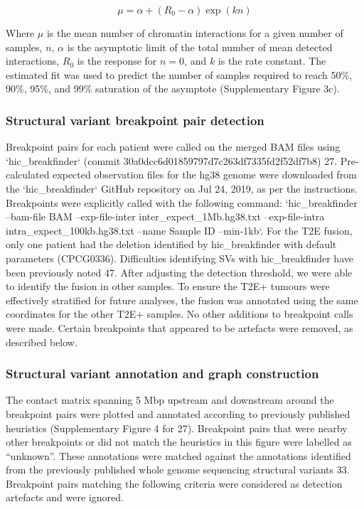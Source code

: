 \begin{equation}
 \mu = \alpha + \left( R_0 - \alpha \right) \exp \left(kn \right)
\end{equation}

Where $\mu$ is the mean number of chromatin interactions for a given number of samples, $n$, $\alpha$ is the asymptotic limit of the total number of mean detected interactions, $R_0$ is the response for $n = 0$, and $k$ is the rate constant.
The estimated fit was used to predict the number of samples required to reach 50\%, 90\%, 95\%, and 99\% saturation of the asymptote (Supplementary Figure 3c).

\subsubsection{Structural variant breakpoint pair detection}

Breakpoint pairs for each patient were called on the merged BAM files using `hic_breakfinder` (commit 30a0dcc6d01859797d7c263df7335fd2f52df7b8) 27.
Pre-calculated expected observation files for the hg38 genome were downloaded from the `hic_breakfinder` GitHub repository on Jul 24, 2019, as per the instructions.
Breakpoints were explicitly called with the following command: `hic_breakfinder --bam-file {BAM} --exp-file-inter inter_expect_1Mb.hg38.txt --exp-file-intra intra_expect_100kb.hg38.txt --name {Sample ID} --min-1kb`.
For the T2E fusion, only one patient had the deletion identified by hic_breakfinder with default parameters (CPCG0336).
Difficulties identifying SVs with hic_breakfinder have been previously noted 47.
After adjusting the detection threshold, we were able to identify the fusion in other samples.
To ensure the T2E+ tumours were effectively stratified for future analyses, the fusion was annotated using the same coordinates for the other T2E+ samples.
No other additions to breakpoint calls were made.
Certain breakpoints that appeared to be artefacts were removed, as described below.

\subsubsection{Structural variant annotation and graph construction}
The contact matrix spanning 5 Mbp upstream and downstream around the breakpoint pairs were plotted and annotated according to previously published heuristics (Supplementary Figure 4 for 27).
Breakpoint pairs that were nearby other breakpoints or did not match the heuristics in this figure were labelled as “unknown”.
These annotations were matched against the annotations identified from the previously published whole genome sequencing structural variants 33.
Breakpoint pairs matching the following criteria were considered as detection artefacts and were ignored.

